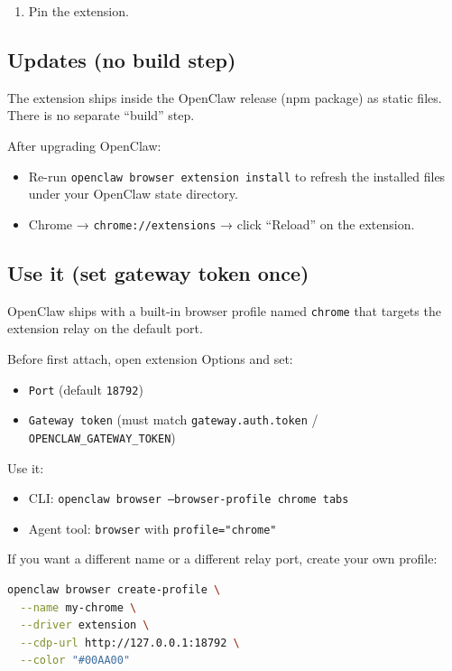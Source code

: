 \begin{enumerate}
  \item Pin the extension.
\end{enumerate}


\subsection{Updates (no build step)}


The extension ships inside the OpenClaw release (npm package) as static files. There is no separate “build” step.

After upgrading OpenClaw:

\begin{itemize}
  \item Re-run \texttt{openclaw browser extension install} to refresh the installed files under your OpenClaw state directory.
  \item Chrome → \texttt{chrome://extensions} → click “Reload” on the extension.
\end{itemize}


\subsection{Use it (set gateway token once)}


OpenClaw ships with a built-in browser profile named \texttt{chrome} that targets the extension relay on the default port.

Before first attach, open extension Options and set:

\begin{itemize}
  \item \texttt{Port} (default \texttt{18792})
  \item \texttt{Gateway token} (must match \texttt{gateway.auth.token} / \texttt{OPENCLAW\_GATEWAY\_TOKEN})
\end{itemize}


Use it:

\begin{itemize}
  \item CLI: \texttt{openclaw browser --browser-profile chrome tabs}
  \item Agent tool: \texttt{browser} with \texttt{profile="chrome"}
\end{itemize}


If you want a different name or a different relay port, create your own profile:

\begin{lstlisting}[language=bash]
openclaw browser create-profile \
  --name my-chrome \
  --driver extension \
  --cdp-url http://127.0.0.1:18792 \
  --color "#00AA00"
\end{lstlisting}


